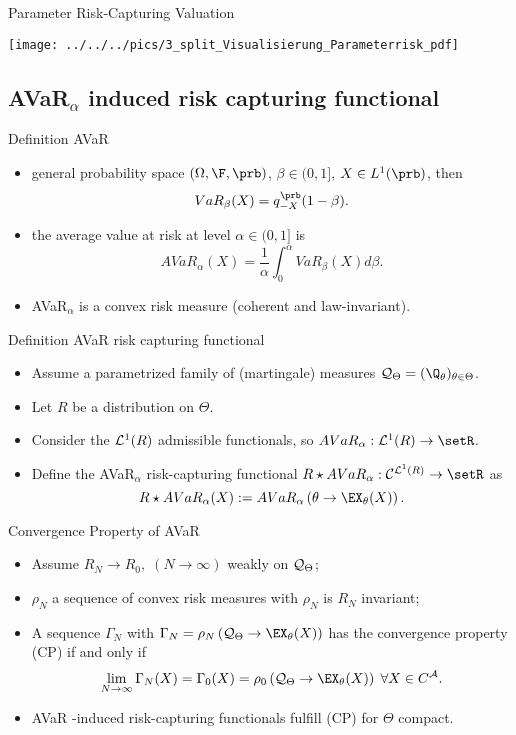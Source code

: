 {Parameter Risk-Capturing Valuation}
\begin{center}
\texttt{[image: ../../../pics/3\_split\_Visualisierung\_Parameterrisk\_pdf]}
\end{center}



\subsection{AVaR$_\alpha$ induced risk capturing functional}


{Definition AVaR}
\begin{itemize}
\item general probability space $(\Omega, \F, \prb)$, $\beta \in (0,1]$, $X\in L^1(\prb)$, then
$$
VaR_\beta(X) = q_{-X}^{\prb}(1-\beta).
$$
\item the average value at risk at level $\alpha \in (0,1]$ is
$$
AVaR_\alpha(X) = \frac{1}{\alpha} \int_0^\alpha VaR_\beta(X) d\beta.
$$
\item AVaR$_\alpha$ is a convex risk measure (coherent and law-invariant).
\end{itemize}



{Definition AVaR risk capturing functional}
\begin{itemize}
\item Assume a  parametrized family of (martingale) measures ${\cal Q}_\Theta = (\Q_\theta)_{\theta \in \Theta}$.
\item Let $R$ be a distribution on $\Theta$.
\item Consider the ${\cal L}^1(R)$ admissible functionals, so $AVaR_\alpha:  {\cal L}^1(R) \rightarrow \setR$.
\item Define the AVaR$_\alpha$ risk-capturing functional
$
R \star AVaR_\alpha: {\cal C}^{{\cal L}^1(R)}\rightarrow \setR
$
as
$$
R \star AVaR_\alpha(X) := AVaR_\alpha\left(\theta \rightarrow \EX_\theta(X) \right).
$$
\end{itemize}



{Convergence Property of AVaR}
\begin{itemize}
\item Assume $R_N \rightarrow R_0, \; (N\rightarrow \infty) $ weakly on ${\cal Q}_\Theta$;
\item $\rho_N$ a sequence of convex risk measures with $\rho_N$ is $R_N$ invariant;
\item A sequence $\Gamma_N$ with $\Gamma_N= \rho_N\left({\cal Q}_\Theta \rightarrow \EX_\theta(X) \right)$ has the convergence property (CP) if and only if
$$
\lim_{N \rightarrow \infty} \Gamma_N(X) = \Gamma_0(X) = \rho_0 \left({\cal Q}_\Theta \rightarrow \EX_\theta(X) \right) \; \forall X \in C^{\cal A}.
$$
\item AVaR -induced risk-capturing functionals fulfill (CP) for $\Theta$ compact.
\end{itemize}



